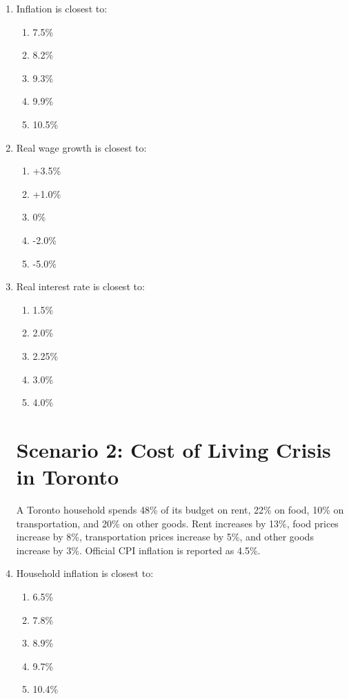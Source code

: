 \documentclass[12pt]{article}
\begin{document}
\begin{enumerate}[label=\textbf{\arabic*.}]

\item Inflation is closest to:
\begin{enumerate}[label=\Alph*.]
\item 7.5\%
\item 8.2\%
\item 9.3\%
\item 9.9\%
\item 10.5\%
\end{enumerate}

\item Real wage growth is closest to:
\begin{enumerate}[label=\Alph*.]
\item +3.5\%
\item +1.0\%
\item 0\%
\item -2.0\%
\item -5.0\%
\end{enumerate}

\item Real interest rate is closest to:
\begin{enumerate}[label=\Alph*.]
\item 1.5\%
\item 2.0\%
\item 2.25\%
\item 3.0\%
\item 4.0\%
\end{enumerate}
\newpage
\section*{Scenario 2: Cost of Living Crisis in Toronto}

A Toronto household spends 48\% of its budget on rent, 22\% on food, 10\% on transportation, and 20\% on other goods. Rent increases by 13\%, food prices increase by 8\%, transportation prices increase by 5\%, and other goods increase by 3\%. Official CPI inflation is reported as 4.5\%.

\item Household inflation is closest to:
\begin{enumerate}[label=\Alph*.]
\item 6.5\%
\item 7.8\%
\item 8.9\%
\item 9.7\%
\item 10.4\%
\end{enumerate}


\end{enumerate}
\end{document}
